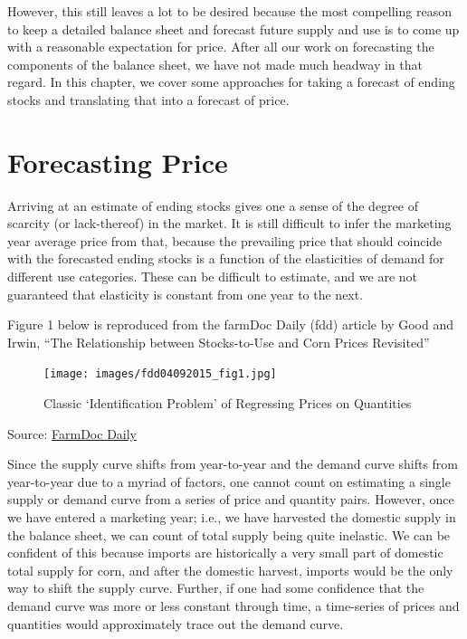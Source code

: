 \documentclass[
  letterpaper,
  DIV=11,
  numbers=noendperiod]{scrreprt}
\begin{document}
However, this still leaves a lot to be desired because the most
compelling reason to keep a detailed balance sheet and forecast future
supply and use is to come up with a reasonable expectation for price.
After all our work on forecasting the components of the balance sheet,
we have not made much headway in that regard. In this chapter, we cover
some approaches for taking a forecast of ending stocks and translating
that into a forecast of price.

\section{Forecasting Price}\label{forecasting-price}

Arriving at an estimate of ending stocks gives one a sense of the degree
of scarcity (or lack-thereof) in the market. It is still difficult to
infer the marketing year average price from that, because the prevailing
price that should coincide with the forecasted ending stocks is a
function of the elasticities of demand for different use categories.
These can be difficult to estimate, and we are not guaranteed that
elasticity is constant from one year to the next.

Figure 1 below is reproduced from the farmDoc Daily (fdd) article by
Good and Irwin, ``The Relationship between Stocks-to-Use and Corn Prices
Revisited''

\begin{figure}[H]

{\centering \texttt{[image: images/fdd04092015\_fig1.jpg]}

}

\caption{Classic `Identification Problem' of Regressing Prices on
Quantities}

\end{figure}%

Source:
\href{http://farmdocdaily.illinois.edu/2015/04/relationship-stock-to-use-and-corn-prices.html}{FarmDoc
Daily}

Since the supply curve shifts from year-to-year and the demand curve
shifts from year-to-year due to a myriad of factors, one cannot count on
estimating a single supply or demand curve from a series of price and
quantity pairs. However, once we have entered a marketing year; i.e., we
have harvested the domestic supply in the balance sheet, we can count of
total supply being quite inelastic. We can be confident of this because
imports are historically a very small part of domestic total supply for
corn, and after the domestic harvest, imports would be the only way to
shift the supply curve. Further, if one had some confidence that the
demand curve was more or less constant through time, a time-series of
prices and quantities would approximately trace out the demand curve.
\end{document}
